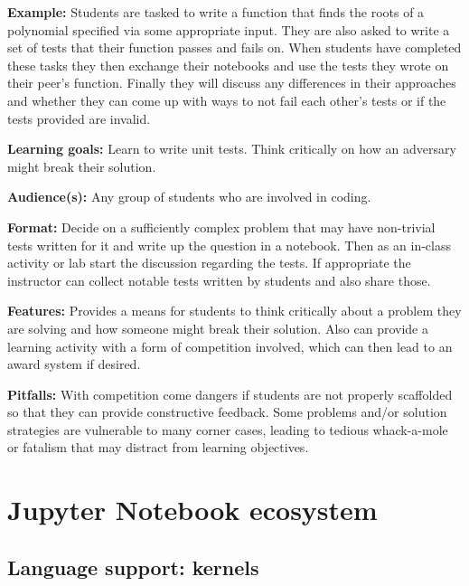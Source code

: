 \documentclass[]{book}
\begin{document}
\textbf{Example:}
Students are tasked to write a function that finds the roots of a polynomial
specified via some appropriate input. They are also asked to write a set of
tests that their function passes and fails on. When students have completed
these tasks they then exchange their notebooks and use the tests they wrote on
their peer's function. Finally they will discuss any differences in their
approaches and whether they can come up with ways to not fail each other's
tests or if the tests provided are invalid.

\textbf{Learning goals:}
Learn to write unit tests. Think critically on how an adversary might break their solution.

\textbf{Audience(s):}
Any group of students who are involved in coding.

\textbf{Format:}
Decide on a sufficiently complex problem that may have non-trivial tests
written for it and write up the question in a notebook. Then as an in-class
activity or lab start the discussion regarding the tests. If appropriate the
instructor can collect notable tests written by students and also share those.

\textbf{Features:}
Provides a means for students to think critically about a problem they are
solving and how someone might break their solution. Also can provide a learning
activity with a form of competition involved, which can then lead to an award
system if desired.

\textbf{Pitfalls:}
With competition come dangers if students are not properly scaffolded so that
they can provide constructive feedback. Some problems and/or solution
strategies are vulnerable to many corner cases, leading to tedious whack-a-mole
or fatalism that may distract from learning objectives.

\hypertarget{jupyter}{%
\chapter{Jupyter Notebook ecosystem}\label{jupyter}}

\hypertarget{language-support-kernels}{%
\section{Language support: kernels}\label{language-support-kernels}}
\end{document}
